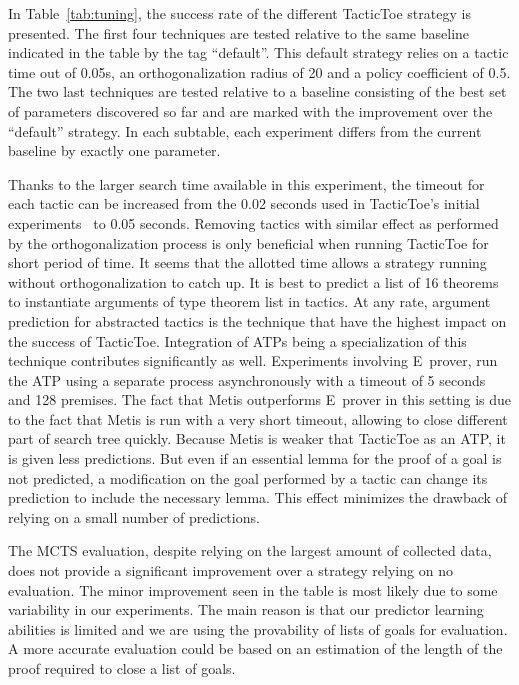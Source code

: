 \documentclass[runningheads,a4paper,draft]{svjour3}
\def\eprover{\textsf{E~prover}\xspace}
\def\metis{\textsf{Metis}\xspace}
\def\tactictoe{\textsf{TacticToe}\xspace}
\begin{document}
In Table~\ref{tab:tuning}, the success rate of the different \tactictoe
strategy is presented.
The first four techniques are tested relative to the same baseline indicated in
the table by the tag ``default''.  This default strategy relies on a tactic
time out of 0.05s, an orthogonalization radius of 20 and a policy coefficient of
0.5.
The two last techniques are tested relative
to a baseline consisting of the best set of parameters discovered so far and
are marked with the improvement over the ``default'' strategy.
In each subtable, each experiment differs from the current baseline by exactly
one parameter.

Thanks to the larger search time available in this experiment, the timeout for
each tactic can be increased from the 0.02 seconds used in \tactictoe's initial
experiments~\cite{tgckju-lpar17} to 0.05
seconds. Removing tactics with similar effect as performed by the
orthogonalization process is only beneficial when running \tactictoe for short
period of time. It seems that the allotted time allows a strategy
running without orthogonalization to catch up.
It is best to predict a list of 16 theorems to instantiate arguments of type
theorem list in tactics. At any rate, argument prediction for abstracted
tactics is the technique that have the highest impact on the success of
\tactictoe. Integration of ATPs being a specialization of this technique
contributes significantly as well. Experiments involving \eprover, run the ATP
using a separate process asynchronously with a timeout of 5 seconds and 128 premises.
The fact that \metis outperforms \eprover in this setting is due to the fact
that \metis is run with a very short timeout, allowing to close different part
of search tree quickly. Because \metis is weaker that \tactictoe as an ATP, it
is given less predictions. But even if an essential lemma for the proof of a
goal is not predicted, a modification on the goal performed by a tactic can
change its prediction to include the necessary lemma.
This effect minimizes the drawback of relying on a small number of predictions.

The MCTS evaluation, despite relying on the largest amount of collected data,
does not provide a significant improvement over a strategy relying on no
evaluation. The minor improvement seen in the table is most likely due to some
variability in our experiments.
The main reason is that our predictor learning abilities is
limited and we are using the provability of lists of goals for evaluation. A
more accurate evaluation could be based on an estimation of the length of the
proof required to close a list of goals.
\end{document}
